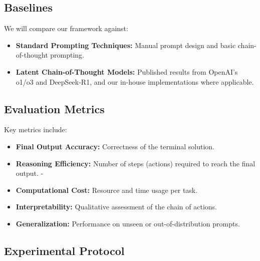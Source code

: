 \documentclass[10pt,journal,compsoc]{IEEEtran}
\begin{document}
\subsection{Baselines}

We will compare our framework against:
\begin{itemize}
\item \textbf{Standard Prompting Techniques:} Manual prompt design and basic chain-of-thought prompting.
\item \textbf{Latent Chain-of-Thought Models:} Published results from OpenAI's o1/o3 and DeepSeek-R1, and our in-house implementations where applicable.
\end{itemize}

\subsection{Evaluation Metrics}

Key metrics include:

\begin{itemize}
\item \textbf{Final Output Accuracy:} Correctness of the terminal solution.
\item \textbf{Reasoning Efficiency:} Number of steps (actions) required to reach the final output. -
\item \textbf{Computational Cost:} Resource and time usage per task.
\item \textbf{Interpretability:} Qualitative assessment of the chain of actions.
\item \textbf{Generalization:} Performance on unseen or out-of-distribution prompts.
\end{itemize}

\subsection{Experimental Protocol}
\end{document}
